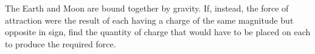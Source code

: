The Earth and Moon are bound together by gravity.  If,
        instead, the force of attraction were the result of each
        having a charge of the same magnitude but opposite in sign,
        find the quantity of charge that would have to be placed on
        each to produce the required force.\answercheck
